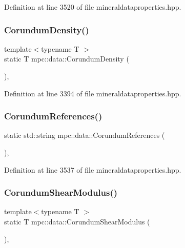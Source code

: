 Definition at line 3520 of file mineraldataproperties.\+hpp.

\mbox{\label{namespacempc_1_1data_ac8d3f7649e1181d8ad8464f25535b3ff}} 
\subsubsection{\texorpdfstring{Corundum\+Density()}{CorundumDensity()}}
{\footnotesize\ttfamily template$<$typename T $>$ \\
static T mpc\+::data\+::\+Corundum\+Density (\begin{DoxyParamCaption}{ }\end{DoxyParamCaption})\hspace{0.3cm}{\ttfamily [inline]}, {\ttfamily [static]}}



Definition at line 3394 of file mineraldataproperties.\+hpp.

\mbox{\label{namespacempc_1_1data_acedbe3045d8f2a9cd517807f47674c9d}} 
\subsubsection{\texorpdfstring{Corundum\+References()}{CorundumReferences()}}
{\footnotesize\ttfamily static std\+::string mpc\+::data\+::\+Corundum\+References (\begin{DoxyParamCaption}{ }\end{DoxyParamCaption})\hspace{0.3cm}{\ttfamily [inline]}, {\ttfamily [static]}}



Definition at line 3537 of file mineraldataproperties.\+hpp.

\mbox{\label{namespacempc_1_1data_ae7092346af51207cabe2991b51981fcb}} 
\subsubsection{\texorpdfstring{Corundum\+Shear\+Modulus()}{CorundumShearModulus()}}
{\footnotesize\ttfamily template$<$typename T $>$ \\
static T mpc\+::data\+::\+Corundum\+Shear\+Modulus (\begin{DoxyParamCaption}{ }\end{DoxyParamCaption})\hspace{0.3cm}{\ttfamily [inline]}, {\ttfamily [static]}}



